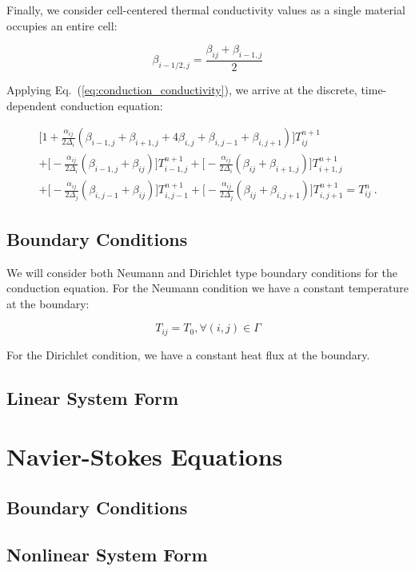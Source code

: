 \documentclass[letterpaper,12pt]{article}
\begin{document}
Finally, we consider cell-centered thermal conductivity values as a
single material occupies an entire cell:

\begin{equation}
  \beta_{i-1/2,j} = \frac{\beta_{ij}+\beta_{i-1,j}}{2}
  \label{eq:conduction_conductivity}
\end{equation}

Applying Eq.~(\ref{eq:conduction_conductivity}), we arrive at the discrete,
time-dependent conduction equation:

\begin{multline}
 \Big[1 + \frac{\alpha_{ij}}{2\Delta_i}(\beta_{i-1,j} +
   \beta_{i+1,j} + 4 \beta_{i,j} + \beta_{i,j-1} + \beta_{i,j+1})\Big]
 T^{n+1}_{ij} \\
 + \Big[-\frac{\alpha_{ij}}{2 \Delta_i}
   (\beta_{i-1,j}+\beta_{ij})\Big] T^{n+1}_{i-1,j}
 + \Big[-\frac{\alpha_{ij}}{2 \Delta_i}(\beta_{ij}+\beta_{i+1,j})\Big]
 T^{n+1}_{i+1,j} \\
 + \Big[-\frac{\alpha_{ij}}{2 \Delta_j}
   (\beta_{i,j-1}+\beta_{ij})\Big] T^{n+1}_{i,j-1} +
 \Big[-\frac{\alpha_{ij}}{2 \Delta_j}(\beta_{ij}+\beta_{i,j+1})\Big]
 T^{n+1}_{i,j+1} = T^n_{ij}\:.
 \label{eq:conduction_discrete_equation}
\end{multline}


\subsection{Boundary Conditions}

We will consider both Neumann and Dirichlet type boundary conditions
for the conduction equation. For the Neumann condition we have a
constant temperature at the boundary:

\begin{equation}
  T_{ij} = T_0, \forall (i,j) \in \Gamma
  \label{eq:conduction_neumann}
\end{equation}

For the Dirichlet condition, we have a constant heat flux at the boundary.

\subsection{Linear System Form}

\section{Navier-Stokes Equations}

\subsection{Boundary Conditions}

\subsection{Nonlinear System Form}

\pagebreak
 
\end{document}

